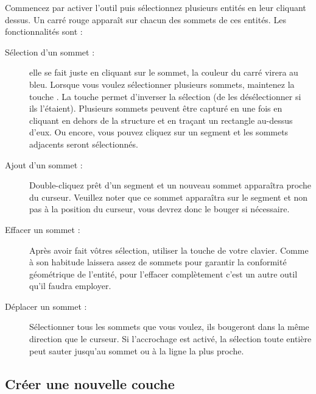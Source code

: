 
Commencez par activer l'outil  puis sélectionnez plusieurs entités en leur cliquant dessus. Un carré rouge apparaît sur chacun des sommets de ces entités. Les fonctionnalités sont :

\begin{description}
\item[Sélection d'un sommet :] elle se fait juste en cliquant sur le sommet, la couleur du carré virera au bleu. Lorsque vous voulez sélectionner plusieurs sommets, maintenez la touche . La touche   permet d'inverser la sélection (de les désélectionner si ils l'étaient). Plusieurs sommets peuvent être capturé en une fois en cliquant en dehors de la structure et en traçant un rectangle au-dessus d'eux. Ou encore, vous pouvez cliquez sur un segment et les sommets adjacents seront sélectionnés.
\item[Ajout d'un sommet :] Double-cliquez prêt d'un segment et un nouveau sommet apparaîtra proche du curseur. Veuillez noter que ce sommet apparaîtra sur le segment et non pas à la position du curseur, vous devrez donc le bouger si nécessaire.
\item[Effacer un sommet :] Après avoir fait vôtres sélection, utiliser la touche  de votre clavier. Comme à son habitude \qg laissera assez de sommets pour garantir la conformité géométrique de l'entité, pour l'effacer complètement c'est un autre outil qu'il faudra employer.
\item[Déplacer un sommet :] Sélectionner tous les sommets que vous voulez, ils bougeront dans la même direction que le curseur. Si l'accrochage est activé, la sélection toute entière peut sauter jusqu'au sommet ou à la ligne la plus proche.
\end{description}

\subsection{Créer une nouvelle couche}\label{sec:create shape}

